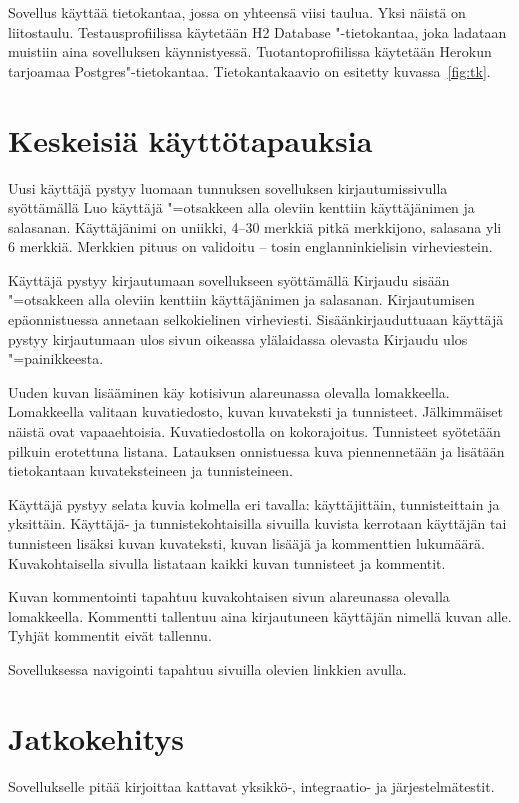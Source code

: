 \documentclass[finnish,colorlinks,headings=normal,parskip=half,footsepline]{scrartcl}
\begin{document}
Sovellus käyttää tietokantaa, jossa on yhteensä viisi taulua. Yksi näistä on liitostaulu. Testausprofiilissa käytetään H2 Database "-tietokantaa, joka ladataan muistiin aina sovelluksen käynnistyessä. Tuotantoprofiilissa käytetään Herokun tarjoamaa Postgres"-tietokantaa. Tietokantakaavio on esitetty kuvassa~\ref{fig:tk}.

\section{Keskeisiä käyttötapauksia}
Uusi käyttäjä pystyy luomaan tunnuksen sovelluksen kirjautumissivulla syöttämällä Luo käyttäjä "=otsakkeen alla oleviin kenttiin käyttäjänimen ja salasanan. Käyttäjänimi on uniikki, 4--30 merkkiä pitkä merkkijono, salasana yli 6 merkkiä. Merkkien pituus on validoitu -- tosin englanninkielisin virheviestein.

Käyttäjä pystyy kirjautumaan sovellukseen syöttämällä Kirjaudu sisään "=otsakkeen alla oleviin kenttiin käyttäjänimen ja salasanan. Kirjautumisen epäonnistuessa annetaan selkokielinen virheviesti. Sisäänkirjauduttuaan käyttäjä pystyy kirjautumaan ulos sivun oikeassa ylälaidassa olevasta Kirjaudu ulos "=painikkeesta.

Uuden kuvan lisääminen käy kotisivun alareunassa olevalla lomakkeella. Lomakkeella valitaan kuvatiedosto, kuvan kuvateksti ja tunnisteet. Jälkimmäiset näistä ovat vapaaehtoisia. Kuvatiedostolla on kokorajoitus. Tunnisteet syötetään pilkuin erotettuna listana. Latauksen onnistuessa kuva piennennetään ja lisätään tietokantaan kuvateksteineen ja tunnisteineen.

Käyttäjä pystyy selata kuvia kolmella eri tavalla: käyttäjittäin, tunnisteittain ja yksittäin. Käyttäjä- ja tunnistekohtaisilla sivuilla kuvista kerrotaan käyttäjän tai tunnisteen lisäksi kuvan kuvateksti, kuvan lisääjä ja kommenttien lukumäärä. Kuvakohtaisella sivulla listataan kaikki kuvan tunnisteet ja kommentit.

Kuvan kommentointi tapahtuu kuvakohtaisen sivun alareunassa olevalla lomakkeella. Kommentti tallentuu aina kirjautuneen käyttäjän nimellä kuvan alle. Tyhjät kommentit eivät tallennu.

Sovelluksessa navigointi tapahtuu sivuilla olevien linkkien avulla.

\section{Jatkokehitys}
Sovellukselle pitää kirjoittaa kattavat yksikkö-, integraatio- ja järjestelmätestit.
\end{document}
